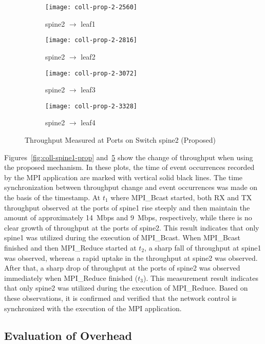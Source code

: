 \begin{figure}
    \begin{subfigure}{.45\linewidth}
        \texttt{[image: coll-prop-2-2560]}
        \caption{spine2 $\to$ leaf1}%
        \label{fig:spine2-leaf1-prop}
    \end{subfigure}
    \begin{subfigure}{.45\linewidth}
        \texttt{[image: coll-prop-2-2816]}
        \caption{spine2 $\to$ leaf2}%
        \label{fig:spine2-leaf2-prop}
    \end{subfigure}
    \begin{subfigure}{.45\linewidth}
        \texttt{[image: coll-prop-2-3072]}
        \caption{spine2 $\to$ leaf3}%
        \label{fig:spine2-leaf3-prop}
    \end{subfigure}
    \begin{subfigure}{.45\linewidth}
        \texttt{[image: coll-prop-2-3328]}
        \caption{spine2 $\to$ leaf4}%
        \label{fig:spine2-leaf4-prop}
    \end{subfigure}
    \caption{Throughput Measured at Ports on Switch spine2 (Proposed)}%
    \label{fig:coll-spine2-prop}
\end{figure}


Figures~\ref{fig:coll-spine1-prop} and~\ref{fig:coll-spine2-prop} show
the change of throughput when using the proposed mechanism. In these
plots, the time of event occurrences recorded by the MPI application are
marked with vertical solid black lines. The time synchronization between
throughput change and event occurrences was made on the basis of the
timestamp. At \(t_1\) where MPI\_Bcast started, both RX and TX
throughput observed at the ports of spine1 rise steeply and then
maintain the amount of approximately 14~Mbps and 9~Mbps, respectively,
while there is no clear growth of throughput at the ports of spine2.
This result indicates that only spine1 was utilized during the execution of
MPI\_Bcast. When MPI\_Bcast finished and then MPI\_Reduce started at
\(t_2\), a sharp fall of throughput at spine1 was observed, whereas a
rapid uptake in the throughput at spine2 was observed. After that, a
sharp drop of throughput at the ports of spine2 was observed immediately
when MPI\_Reduce finished (\(t_3\)). This measurement result indicates
that only spine2 was utilized during the execution of MPI\_Reduce. Based
on these observations, it is confirmed and verified that the network
control is synchronized with the execution of the MPI application.

\subsection{Evaluation of Overhead}

